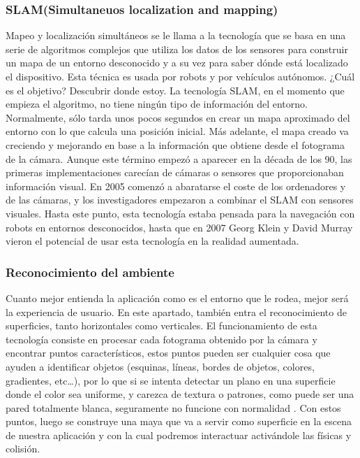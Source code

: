 \subsubsection{SLAM(Simultaneuos localization and mapping)}
Mapeo y localización simultáneos se le llama a la tecnología que se basa en una serie de algoritmos complejos que utiliza los datos de los sensores para construir un mapa de un entorno desconocido y a su vez para saber dónde está localizado el dispositivo. Esta técnica es usada por robots y por vehículos autónomos. 
¿Cuál es el objetivo? Descubrir donde estoy. La tecnología SLAM, en el momento que empieza el algoritmo, no tiene ningún tipo de información del entorno. Normalmente, sólo tarda unos pocos segundos en crear un mapa aproximado del entorno con lo que calcula una posición inicial. Más adelante, el mapa creado va creciendo y mejorando en base a la información que obtiene desde el fotograma de la cámara.
Aunque este término empezó a aparecer en la década de los 90, las primeras implementaciones carecían de cámaras o sensores que proporcionaban información visual. En 2005 comenzó a abaratarse el coste de los ordenadores y de las cámaras, y los investigadores empezaron a combinar el SLAM con sensores visuales. Hasta este punto, esta tecnología estaba pensada para la navegación con robots en entornos desconocidos, hasta que en 2007 Georg Klein y David Murray vieron el potencial de usar esta tecnología en la realidad aumentada. \cite{MaxstMedium}

\subsubsection{Reconocimiento del ambiente}
Cuanto mejor entienda la aplicación como es el entorno que le rodea, mejor será la experiencia de usuario. En este apartado, también entra el reconocimiento de superficies, tanto horizontales como verticales. El funcionamiento de esta tecnología consiste en procesar cada fotograma obtenido por la cámara y encontrar puntos característicos, estos puntos pueden ser cualquier cosa que ayuden a identificar objetos (esquinas, líneas, bordes de objetos, colores, gradientes, etc…), por lo que si se intenta detectar un plano en una superficie donde el color sea uniforme, y carezca de textura o patrones, como puede ser una pared totalmente blanca, seguramente no funcione con normalidad \cite{ARCoreConcepts}. Con estos puntos, luego se construye una maya que va a servir como superficie en la escena de nuestra aplicación y con la cual podremos interactuar activándole las físicas y colisión.
